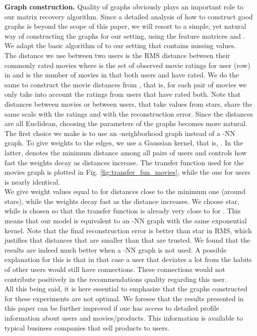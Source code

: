 \documentclass{article}
\begin{document}
{\bf Graph construction.}
Quality of graphs obviously plays an important role to our matrix recovery algorithm. Since a detailed analysis of how to construct good graphs is beyond the scope of this paper, we will resort to a simple, yet natural way of constructing the graphs for our setting, using the feature matrices  and . We adapt the basic algorithm of \cite{belkin2003laplacian} to our setting that contains missing values. \\
The distance we use between two users is the RMS distance between their commonly rated movies
 where  is the set of observed movie ratings for user (row)  in  and  is the number of movies in  that both users  and  have rated. We do the same to construct the movie distances from , that is, for each pair of movies we only take into account the ratings from users that have rated both. Note that distances between movies or between users, that take values from  stars, share the same scale with the ratings and with the reconstruction error. Since the distances are all Euclidean, choosing the parameters of the graphs becomes more natural. The first choice we make is to use an -neighborhood graph instead of a -NN graph. To give weights to the edges, we use a Gaussian kernel, that is, . In the latter,  denotes the minimum distance among all pairs of users and  controls how fast the weights decay as distances increase. The transfer function used for the movies graph is plotted in Fig. \ref{fig:transfer_fun_movies}, while the one for users is nearly identical.\\
We give weight values equal to  for distances close to the minimum one (around  stars), while the weights decay fast as the distance increases. We choose  star, while  is chosen so that the transfer function is already very close to  for . This means that our model is equivalent to an -NN graph with the same exponential kernel. Note that the final reconstruction error is better than  star in RMS, which justifies that distances that are smaller than that are trusted. We found that the results are indeed much better when a -NN graph is not used. A possible explanation for this is that in that case a user that deviates a lot from the habits of other users would still have  connections. These connections would not contribute positively in the recommendations quality regarding this user. \\ 
All this being said, it is here essential to emphasize that the graphs constructed for these experiments are not optimal. We foresee that the results presented in this paper can be further improved if one has access to detailed profile information about users and movies/products. This information is available to typical business companies that sell products to users.
\end{document}
